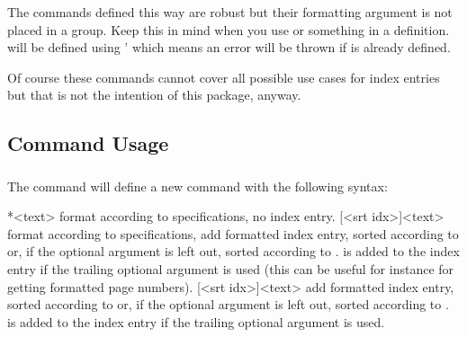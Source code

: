 \documentclass{cnpkgdoc}
\begin{document}
The commands  defined this way are robust but their formatting
argument is not placed in a group.  Keep this in mind when you use
 or something in a definition.   will be defined
using '  which means an error will be thrown
if  is already defined.

Of course these commands cannot cover all possible use cases for index entries
but that is not the intention of this package, anyway.

\subsection{Command Usage}\label{ssec:command:usage}
\subsubsection{}\label{ssec:command:usage:newidxcmd}
The command  will define a
new command  with the following syntax:
\begin{beschreibung}
  *{<text>}\newline
    format  according to specifications, no index entry.
  [<srt idx>]{<text>}\newline
    format  according to specifications, add formatted index
    entry, sorted according to  or, if the optional argument
    is left out, sorted according to .   is added to
    the index entry if the trailing optional argument is used (this can be
    useful for instance for getting formatted page numbers).
  [<srt idx>]{<text>}\newline
    add formatted index entry, sorted according to  or, if the
    optional argument is left out, sorted according to .
     is added to the index entry if the trailing optional argument
    is used.
\end{beschreibung}
\end{document}
